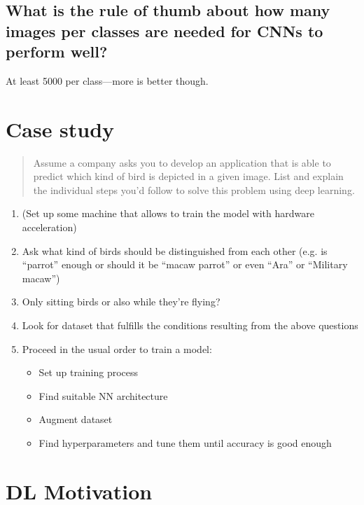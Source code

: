 \subsection{What is the rule of thumb about how many images per classes are needed for CNNs to perform well?}
At least 5000 per class---more is better though.
%
\section{Case study}
\begin{quote}
Assume a company asks you to develop an application that is able to predict which kind of bird is depicted in a given image. List and explain the individual steps you’d follow to solve this problem using deep learning.
\end{quote}
\begin{enumerate}
\item (Set up some machine that allows to train the model with hardware acceleration)
\item Ask what kind of birds should be distinguished from each other (e.g. is ``parrot'' enough or should it be ``macaw parrot'' or even ``Ara'' or ``Military macaw'')
\item Only sitting birds or also while they're flying? 
\item Look for dataset that fulfills the conditions resulting from the above questions
\item Proceed in the usual order to train a model:
\begin{itemize}
\item Set up training process
\item Find suitable NN architecture
\item Augment dataset 
\item Find hyperparameters and tune them until accuracy is good enough
\end{itemize}
\end{enumerate}
%
\section{DL Motivation}
